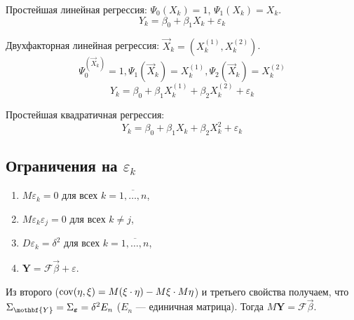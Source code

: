 \begin{ex}
  Простейшая линейная регрессия: $\Psi_0(X_k) = 1$, $\Psi_1(X_k) = X_k$.
  \[
    Y_k = \beta_0 + \beta_1 X_k + \varepsilon_k
  \]
\end{ex}
  Двухфакторная линейная регрессия: $\vec{X}_k = (X_k^{(1)}, X_k^{(2)})$.
  \[
    \Psi_0^(\vec{X}_k) = 1, \Psi_1(\vec{X}_k) = X_k^{(1)}, \Psi_2(\vec{X}_k) = X_k^{(2)}
  \]
  \[
    Y_k = \beta_0 + \beta_1 X_k^{(1)} + \beta_2 X_k^{(2)} + \varepsilon_k
  \]
\begin{ex}
  Простейшая квадратичная регрессия:
  \[
    Y_k = \beta_0 + \beta_1 X_k + \beta_2 X_k^2 + \varepsilon_k
  \]
\end{ex}

\subsection{Ограничения на $\varepsilon_k$}

\begin{enumerate}
  \item $M\varepsilon_k = 0$ для всех $ k = \overline{1, \ldots, n} $,
  \item $M\varepsilon_k \varepsilon_j = 0$ для всех $k \neq j$,
  \item $D \varepsilon_k = \delta^2$ для всех $ k = \overline{1, \ldots, n} $,
  \item $\mathbf Y = \mathcal{F} \vec{\beta} + \varepsilon$.
\end{enumerate}
Из второго ($ \operatorname{cov}(\eta, \xi) = M(\xi\cdot\eta) - M\xi \cdot M\eta $) и третьего свойства получаем, что $\Sigma_{\mothbf{Y}} = \Sigma_{\bm\varepsilon} = \delta^2 E_n$
($E_n$ --- единичная матрица).
Тогда $M\mathbf{Y} = \mathcal{F} \vec{\beta}$.

